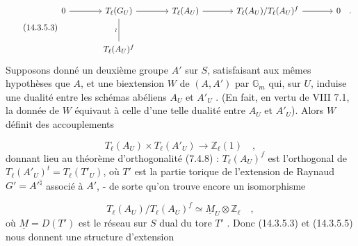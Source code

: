 \begin{equation}\tag{14.3.5.3}
\begin{tikzcd}[row sep=large, column sep=large]
0 \arrow[r] & T_\ell(G_U) \arrow[r] \arrow[d, dash, "\wr"'] & T_\ell(A_U) \arrow[r] & T_\ell(A_U)/T_\ell(A_U)^f \arrow[r] & 0 \quad . \\
& T_\ell(A_U)^f
\end{tikzcd}
\end{equation}
Supposons donné un deuxième groupe $A'$ sur $S$, satisfaisant aux mêmes hypothèses que $A$, et une biextension $W$ de $(A,A')$ par $\mathbb{G}_m$ qui, sur $U$, induise une dualité entre les schémas abéliens $A_U$ et $A'_U$ . (En fait, en vertu de VIII 7.1, la donnée de $W$ équivaut à celle d'une telle dualité entre $A_U$ et $A'_U$). Alors $W$ définit des accouplements

\begin{equation}\tag{14.3.5.4}
T_\ell(A_U) \times T_\ell(A'_U) \longrightarrow \mathbb{Z}_\ell(1) \quad ,
\end{equation}
donnant lieu au théorème d'orthogonalité (7.4.8) : $T_\ell(A_U)^f$ est l'orthogonal de $T_\ell(A'_U)^t = T_\ell(T'_U)$, où $T'$ est la partie torique de l'extension de Raynaud $G' = {A'}^{\natural}$ associé à $A'$, - de sorte qu'on trouve encore un isomorphisme

\begin{equation}\tag{14.3.5.5}
T_\ell(A_U)/T_\ell(A_U)^f \simeq \underline{M}_U \otimes \mathbb{Z}_\ell \quad ,
\end{equation}
où $\underline{M} = D(T')$ est le réseau sur $S$ dual du tore $T'$ . Donc (14.3.5.3) et (14.3.5.5) nous donnent une structure d'extension

